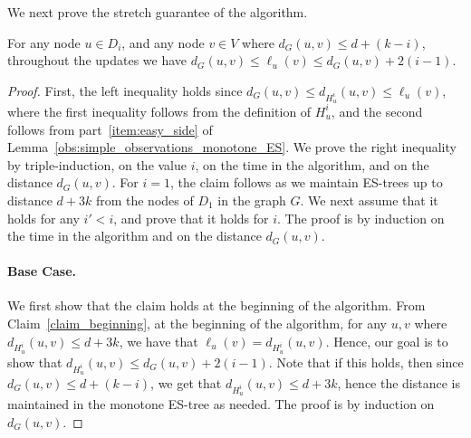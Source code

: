 
We next prove the stretch guarantee of the algorithm.


\begin{lemma}\label{lem_additive_stretch}
For any node $u \in D_i$, and any node $v \in V$ where $d_G(u,v) \leq d+(k-i)$, throughout the updates we have $d_G(u,v) \leq \ell_u(v) \leq  d_G(u,v)+ 2(i-1)$.
\end{lemma}

\begin{proof}
First, the left inequality holds since $d_G(u,v) \leq d_{H_u^i}(u,v) \leq \ell_u(v)$, where the first inequality follows from the definition of $H_u^i$, and the second follows from part~\ref{item:easy_side} of Lemma~\ref{obs:simple_observations_monotone_ES}.
We prove the right inequality by triple-induction, on the value $i$, on the time in the algorithm, and on the distance $d_G(u,v)$.
For $i=1$, the claim follows as we maintain ES-trees up to distance $d+3k$ from the nodes of $D_1$ in the graph $G$. We next assume that it holds for any $i' < i$, and prove that it holds for $i$. The proof is by induction on the time in the algorithm and on the distance $d_G(u,v)$.

\paragraph{Base Case.} We first show that the claim holds at the beginning of the algorithm. From Claim~\ref{claim_beginning}, at the beginning of the algorithm, for any $u,v$ where $d_{H_u^i}(u,v) \leq d+3k$, we have that $\ell_u(v) = d_{H_u^i}(u,v).$ Hence, our goal is to show that $d_{H_u^i}(u,v) \leq d_G(u,v) + 2(i-1)$. Note that if this holds, then since $d_G(u,v) \leq d+(k-i)$, we get that $d_{H_u^i}(u,v) \leq d+3k$, hence the distance is maintained in the monotone ES-tree as needed.
The proof is by induction on $d_G(u,v)$.


\end{proof}
